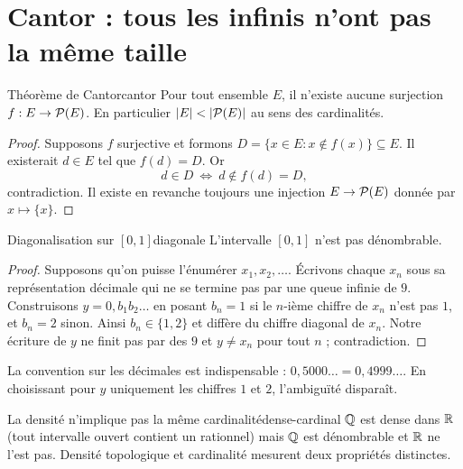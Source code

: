 \section{Cantor : tous les infinis n'ont pas la même taille}
\begin{theoreme}{Théorème de Cantor}{cantor}
Pour tout ensemble $E$, il n'existe aucune surjection $f:E\to\mathcal P(E)$. En particulier $|E|<|\PP(E)|$ au sens des cardinalités.
\end{theoreme}
\begin{proof}
Supposons $f$ surjective et formons $D=\{x\in E:x\notin f(x)\}\subseteq E$. Il existerait $d\in E$ tel que $f(d)=D$. Or
\[d\in D\ \Longleftrightarrow\ d\notin f(d)=D,\]
contradiction. Il existe en revanche toujours une injection $E\to\mathcal P(E)$ donnée par $x\mapsto\{x\}$.
\end{proof}
\begin{theoreme}{Diagonalisation sur $[0,1]$}{diagonale}
L'intervalle $[0,1]$ n'est pas dénombrable.
\end{theoreme}
\begin{proof}
Supposons qu'on puisse l'énumérer $x_1,x_2,\ldots$. Écrivons chaque $x_n$ sous sa représentation décimale qui ne se termine pas par une queue infinie de $9$. Construisons $y=0,b_1b_2\ldots$ en posant $b_n=1$ si le $n$-ième chiffre de $x_n$ n'est pas $1$, et $b_n=2$ sinon. Ainsi $b_n\in\{1,2\}$ et diffère du chiffre diagonal de $x_n$. Notre écriture de $y$ ne finit pas par des $9$ et $y\ne x_n$ pour tout $n$ ; contradiction.
\end{proof}
\begin{attention}
La convention sur les décimales est indispensable : $0,5000\ldots=0,4999\ldots$. En choisissant pour $y$ uniquement les chiffres $1$ et $2$, l'ambiguïté disparaît.
\end{attention}
\begin{exemple}{La densité n'implique pas la même cardinalité}{dense-cardinal}
$\mathbb Q$ est dense dans $\mathbb R$ (tout intervalle ouvert contient un rationnel) mais $\mathbb Q$ est dénombrable et $\mathbb R$ ne l'est pas. Densité topologique et cardinalité mesurent deux propriétés distinctes.
\end{exemple}

